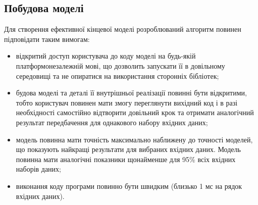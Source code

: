 \subsection{Побудова моделі}
Для створення ефективної кінцевої моделі розроблюваний алгоритм повинен підповідати таким вимогам:
\begin{itemize}  
	\item відкритий доступ користувача до коду моделі на будь-якій платформонезалежній мові, що дозволить запускати її в довільному середовищі та не опиратися на використання сторонніх бібліотек;
	\item будова моделі та деталі її внутрішньої реалізації повинні бути відкритими, тобто користувач повинен мати змогу переглянути вихідний код і в разі необхідності самостійно відтворити довільний крок та отримати аналогічний результат передбачення для однакового набору вхідних даних;
	\item модель повинна мати точність максимально наближену до точності моделей, що показують найкращі результати для вибраних вхідних даних. Модель повинна мати аналогічні показники щонайменше для 95\% всіх вхідних наборів даних;
	\item виконання коду програми повинно бути швидким (близько 1 мс на рядок вхідних даних).
\end{itemize}